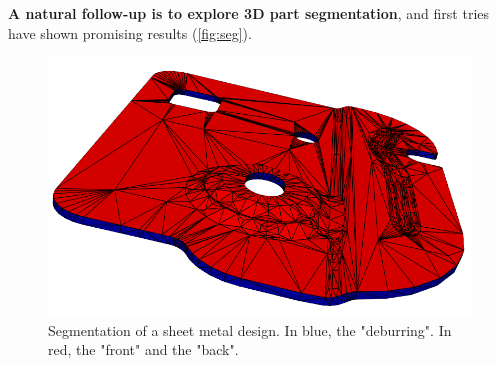 \documentclass{article}
\begin{document}
\textbf{A natural follow-up is to explore 3D part segmentation}, and first tries have shown promising results (\autoref{fig:seg}). 

\begin{figure}[h]
    \centering
    \includegraphics[width=.7\columnwidth]{assets/seg_0.png}
    \caption{Segmentation of a sheet metal design. In blue, the "deburring". In red, the "front" and the "back".}
    \label{fig:seg}
\end{figure}

\nocite{langley00}



\end{document}
